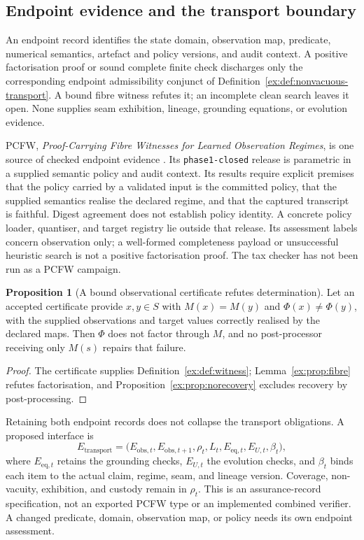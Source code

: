 \documentclass[11pt]{article}
\theoremstyle{definition}
\newtheorem{proposition}{Proposition}[section]
\newcommand{\code}[1]{\texttt{#1}}
\begin{document}
\subsection{Endpoint evidence and the transport boundary}\label{ex:sec:pcfw}

An endpoint record identifies the state domain, observation map, predicate, numerical semantics, artefact and policy versions, and audit context. A positive factorisation proof or sound complete finite check discharges only the corresponding endpoint admissibility conjunct of Definition~\ref{ex:def:nonvacuous-transport}. A bound fibre witness refutes it; an incomplete clean search leaves it open. None supplies seam exhibition, lineage, grounding equations, or evolution evidence.

PCFW, \emph{Proof-Carrying Fibre Witnesses for Learned Observation Regimes}, is one source of checked endpoint evidence \citep{moore2026pcfw}. Its \code{phase1-closed} release is parametric in a supplied semantic policy and audit context. Its results require explicit premises that the policy carried by a validated input is the committed policy, that the supplied semantics realise the declared regime, and that the captured transcript is faithful. Digest agreement does not establish policy identity. A concrete policy loader, quantiser, and target registry lie outside that release. Its assessment labels concern observation only; a well-formed completeness payload or unsuccessful heuristic search is not a positive factorisation proof. The tax checker has not been run as a PCFW campaign.

\begin{proposition}[A bound observational certificate refutes determination]\label{ex:prop:pcfw-refutation}
Let an accepted certificate provide $x,y\in S$ with $M(x)=M(y)$ and $\Phi(x)\neq\Phi(y)$, with the supplied observations and target values correctly realised by the declared maps. Then $\Phi$ does not factor through $M$, and no post-processor receiving only $M(s)$ repairs that failure.
\end{proposition}
\begin{proof}
The certificate supplies Definition~\ref{ex:def:witness}; Lemma~\ref{ex:prop:fibre} refutes factorisation, and Proposition~\ref{ex:prop:norecovery} excludes recovery by post-processing.
\end{proof}

Retaining both endpoint records does not collapse the transport obligations. A proposed interface is
\begin{equation}\label{ex:eq:certificate-interface}
E_{\mathrm{transport}}=
\bigl(E_{\mathrm{obs},t},E_{\mathrm{obs},t+1},
\rho_t,L_t,E_{\mathrm{eq},t},E_{U,t},\beta_t\bigr),
\end{equation}
where $E_{\mathrm{eq},t}$ retains the grounding checks, $E_{U,t}$ the evolution checks, and $\beta_t$ binds each item to the actual claim, regime, seam, and lineage version. Coverage, non-vacuity, exhibition, and custody remain in $\rho_t$. This is an assurance-record specification, not an exported PCFW type or an implemented combined verifier. A changed predicate, domain, observation map, or policy needs its own endpoint assessment.
\end{document}
